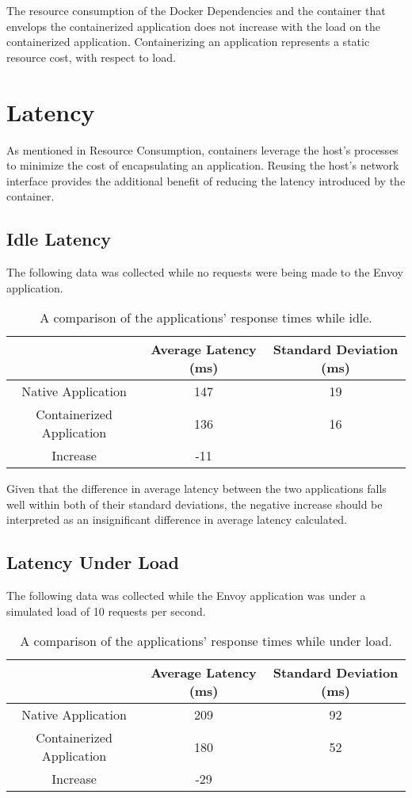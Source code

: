\documentclass{article}
\begin{document}
The resource consumption of the Docker Dependencies and the container that envelops the containerized application does not increase with the load on the containerized application. Containerizing an application represents a static resource cost, with respect to load.

\section{Latency}
As mentioned in Resource Consumption, containers leverage the host's processes to minimize the cost of encapsulating an application. Reusing the host's network interface provides the additional benefit of reducing the latency introduced by the container.

\subsection{Idle Latency}
The following data was collected while no requests were being made to the Envoy application.

\begin{table}[H]
\begin{tabular}{ |c|c|c| }
 \hline
 & Average Latency (ms) & Standard Deviation (ms) \\
 \hline
 Native Application & 147 & 19 \\
 \hline
 Containerized Application & 136 & 16 \\
 \hline\hline
 Increase & -11 & \\
 \hline
\end{tabular}
\caption{A comparison of the applications' response times while idle.}
\label{idle-latency}
\end{table}

Given that the difference in average latency between the two applications falls well within both of their standard deviations, the negative increase should be interpreted as an insignificant difference in average latency calculated.

\subsection{Latency Under Load}
The following data was collected while the Envoy application was under a simulated load of 10 requests per second.

\begin{table}[H]
\begin{tabular}{ |c|c|c| }
 \hline
 & Average Latency (ms) & Standard Deviation (ms) \\
 \hline
 Native Application & 209 & 92 \\
 \hline
 Containerized Application & 180 & 52 \\
 \hline\hline
 Increase & -29 & \\
 \hline
\end{tabular}
\caption{A comparison of the applications' response times while under load.}
\label{latency-under-load}
\end{table}
\end{document}
